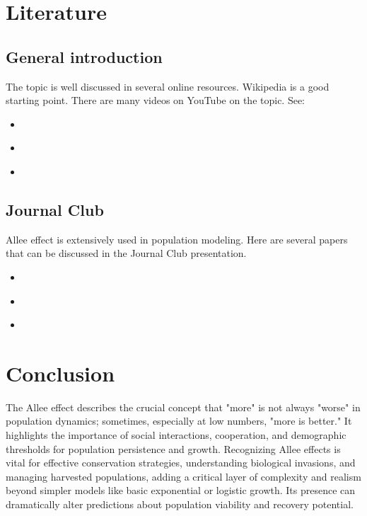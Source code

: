 \documentclass{article}
\begin{document}
\section{Literature}
\subsection{General introduction}
The topic is well discussed in several online resources. Wikipedia is a good starting point. There are many videos on YouTube on the topic. See:
\begin{itemize}
    \item \textcite{WikiAlleeEffect2025}
    \item \textcite{Drake2011_allee}
    \item \textcite{Kramer2017}
\end{itemize}
\subsection{Journal Club}
Allee effect is extensively used in population modeling. Here are several papers that can be discussed in the Journal Club presentation.
\begin{itemize}
    \item \textcite{Mumby2024_allee} 
    \item \textcite{Fadai2020_allee}
    \item \textcite{Tobin2011_allee}
\end{itemize}


\section{Conclusion}

The Allee effect describes the crucial concept that "more" is not always "worse" in population dynamics; sometimes, especially at low numbers, "more is better." It highlights the importance of social interactions, cooperation, and demographic thresholds for population persistence and growth. Recognizing Allee effects is vital for effective conservation strategies, understanding biological invasions, and managing harvested populations, adding a critical layer of complexity and realism beyond simpler models like basic exponential or logistic growth. Its presence can dramatically alter predictions about population viability and recovery potential.


\printbibliography
\end{document}
